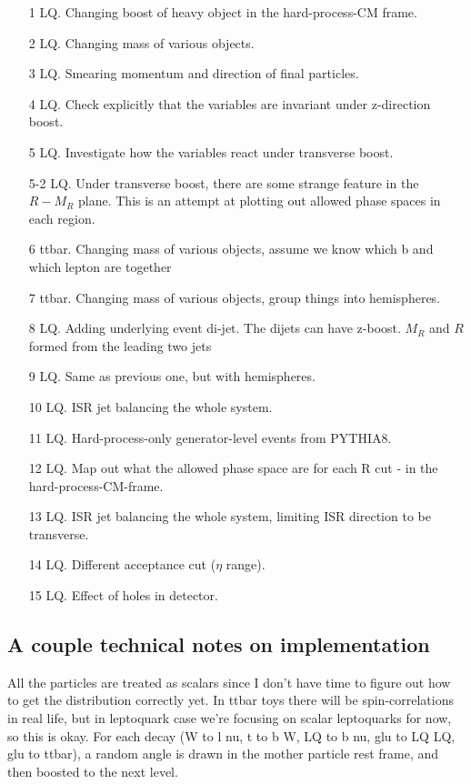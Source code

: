 \documentclass{fheadnote}
\begin{document}
\begin{enumerate}
\item[1] LQ.  Changing boost of heavy object in the hard-process-CM frame.
\item[2] LQ.  Changing mass of various objects.
\item[3] LQ.  Smearing momentum and direction of final particles.
\item[4] LQ.  Check explicitly that the variables are invariant under z-direction boost.
\item[5] LQ.  Investigate how the variables react under transverse boost.
\item[5-2] LQ.  Under transverse boost, there are some strange feature in the $R-M_R$ plane.  This is an attempt at plotting out allowed phase spaces in each region.
\item[6] ttbar.  Changing mass of various objects, assume we know which b and which lepton are together
\item[7] ttbar.  Changing mass of various objects, group things into hemispheres.
\item[8] LQ.  Adding underlying event di-jet.  The dijets can have z-boost.  $M_R$ and $R$ formed from the leading two jets
\item[9] LQ.  Same as previous one, but with hemispheres.
\item[10] LQ.  ISR jet balancing the whole system.
\item[11] LQ.  Hard-process-only generator-level events from PYTHIA8.
\item[12] LQ.  Map out what the allowed phase space are for each R cut - in the hard-process-CM-frame.
\item[13] LQ.  ISR jet balancing the whole system, limiting ISR direction to be transverse.
\item[14] LQ.  Different acceptance cut ($\eta$ range).
\item[15] LQ.  Effect of holes in detector.
\end{enumerate}


\subsection{A couple technical notes on implementation}

All the particles are treated as scalars since I don't have time to figure out how to get the distribution correctly yet.
In ttbar toys there will be spin-correlations in real life, but in leptoquark case we're focusing on scalar leptoquarks for now, so this is okay.
For each decay (W to l nu, t to b W, LQ to b nu, glu to LQ LQ, glu to ttbar), a random angle is drawn in the mother particle rest frame, and then boosted to the next level.
\end{document}
